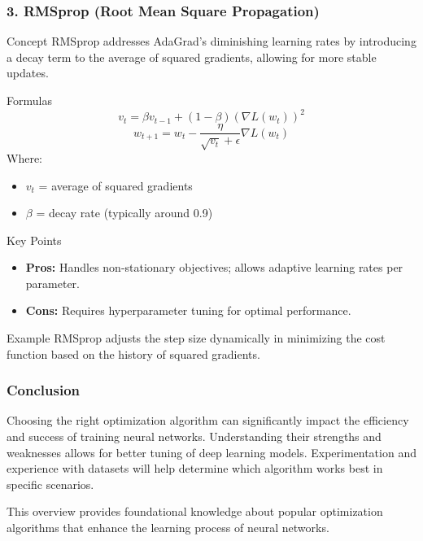 \documentclass[aspectratio=169]{beamer}
\begin{document}
\begin{frame}[fragile]
    \frametitle{3. RMSprop (Root Mean Square Propagation)}
    \begin{block}{Concept}
        RMSprop addresses AdaGrad's diminishing learning rates by introducing a decay term to the average of squared gradients, allowing for more stable updates.
    \end{block}

    \begin{block}{Formulas}
        \begin{equation}
            v_t = \beta v_{t-1} + (1 - \beta)(\nabla L(w_t))^2
        \end{equation}
        \begin{equation}
            w_{t+1} = w_t - \frac{\eta}{\sqrt{v_t} + \epsilon} \nabla L(w_t)
        \end{equation}
        Where:
        \begin{itemize}
            \item \(v_t\) = average of squared gradients
            \item \(\beta\) = decay rate (typically around 0.9)
        \end{itemize}
    \end{block}

    \begin{block}{Key Points}
        \begin{itemize}
            \item \textbf{Pros:} Handles non-stationary objectives; allows adaptive learning rates per parameter.
            \item \textbf{Cons:} Requires hyperparameter tuning for optimal performance.
        \end{itemize}
    \end{block}

    \begin{block}{Example}
        RMSprop adjusts the step size dynamically in minimizing the cost function based on the history of squared gradients.
    \end{block}
\end{frame}

\begin{frame}[fragile]
    \frametitle{Conclusion}
    Choosing the right optimization algorithm can significantly impact the efficiency and success of training neural networks. Understanding their strengths and weaknesses allows for better tuning of deep learning models. Experimentation and experience with datasets will help determine which algorithm works best in specific scenarios.

    This overview provides foundational knowledge about popular optimization algorithms that enhance the learning process of neural networks.
\end{frame}
\end{document}
